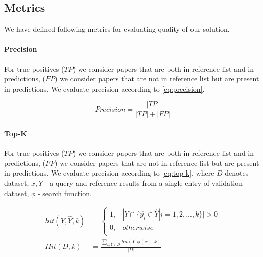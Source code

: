 \documentclass{article}
\begin{document}
    \subsection{Metrics}
    
        We have defined following metrics for evaluating quality of our solution.

        \paragraph{Precision}
       
            For true positives (\(TP\)) we consider papers that are both in reference list and in predictions, (\(FP\)) we consider papers that are not in reference list but are present in predictions. We evaluate precision according to \ref{eq:precision}.


            \begin{equation}
                Precision = \frac{|TP|}{|TP| + |FP|}
                \label{eq:precision}
            \end{equation}

        \paragraph{Top-K}
       
            For true positives (\(TP\)) we consider papers that are both in reference list and in predictions, (\(FP\)) we consider papers that are not in reference list but are present in predictions. We evaluate precision according to \ref{eq:top-k}, where \(D\) denotes dataset, \(x, Y\) - a query and reference results from a single entry of validation dataset, \(\phi\) - search function.


            \begin{equation}
                \begin{split}
                    hit(Y, \hat{Y}, k) &= \left\{\begin{matrix}
                        1, & | Y \cap \{\hat{y_{i}} \in \hat{Y} | i=1,2,...,k\} | > 0 \\
                        0, & otherwise \\
                       \end{matrix}\right. \\ 
                    Hit(D, k) &= \frac{\sum_{x, Y \in D} hit(Y, \phi(x), k)}{|D|}
                \end{split}
                \label{eq:top-k}
            \end{equation}
\end{document}
